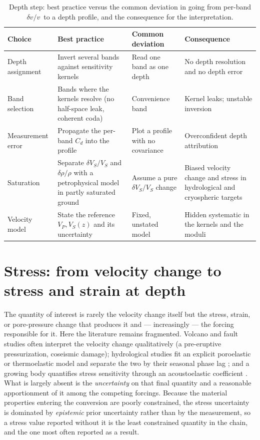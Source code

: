 \documentclass[
  11pt,
  letterpaper,
]{article}
\providecommand{\dvv}{\ensuremath{\delta v/v}}
\begin{document}
\begin{table}[htbp]
\footnotesize
\caption{Depth step: best practice versus the common deviation in going from
per-band \dvv\ to a depth profile, and the consequence for the interpretation.}
\label{tab:bp-depth}
\begin{tabularx}{\textwidth}{@{}>{\raggedright\arraybackslash}p{2.6cm} L L L@{}}
\toprule
\textbf{Choice} & \textbf{Best practice} & \textbf{Common deviation} &
\textbf{Consequence} \\
\midrule
Depth assignment & Invert several bands against sensitivity kernels &
Read one band as one depth & No depth resolution and no depth error \\ \hline
Band selection & Bands where the kernels resolve (no half-space leak, coherent
coda) & Convenience band & Kernel leaks; unstable inversion \\ \hline
Measurement error & Propagate the per-band $C_d$ into the profile & Plot a profile
with no covariance & Overconfident depth attribution \\ \hline
Saturation & Separate $\delta V_S/V_S$ and $\delta\rho/\rho$ with a petrophysical
model in partly saturated ground & Assume a pure $\delta V_S/V_S$ change & Biased
velocity change and stress in hydrological and cryospheric targets \\ \hline
Velocity model & State the reference $V_P,V_S(z)$ and its uncertainty & Fixed,
unstated model & Hidden systematic in the kernels and the moduli \\
\bottomrule
\end{tabularx}
\end{table}

\section{Stress: from velocity change to stress and strain at
depth}\label{sec:stress}

The quantity of interest is rarely the velocity change itself but the
stress, strain, or pore-pressure change that produces it and ---
increasingly --- the forcing responsible for it. Here the literature
remains fragmented. Volcano and fault studies often interpret the
velocity change qualitatively (a pre-eruptive pressurization, coseismic
damage); hydrological studies fit an explicit poroelastic or
thermoelastic model and separate the two by their seasonal phase lag
\citep{Tsai2011, Wang2017, Clements2018}; and a growing body quantifies
stress sensitivity through an acoustoelastic coefficient
\citep{Brenguier2008, Nakata2011}. What is largely absent is the
\emph{uncertainty} on that final quantity and a reasonable apportionment
of it among the competing forcings. Because the material properties
entering the conversion are poorly constrained, the stress uncertainty
is dominated by \emph{epistemic} prior uncertainty rather than by the
measurement, so a stress value reported without it is the least
constrained quantity in the chain, and the one most often reported as a
result.
\end{document}
